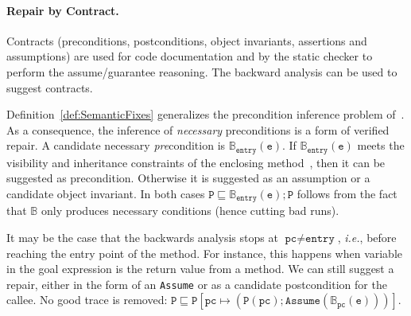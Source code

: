 \documentclass[10pt]{sigplanconf}
\newcommand{\code}[1]{\texttt{#1}}
\begin{document}
\paragraph{Repair by Contract.}
Contracts (preconditions, postconditions, object invariants,
assertions and assumptions) are used for code documentation and by the
static checker to perform the assume/guarantee reasoning.  The
backward analysis can be used to suggest contracts.

Definition~\ref{def:SemanticFixes} generalizes the precondition
inference problem of~\cite{CousotCousotLogozzo-VMCAI11}.  As a
consequence, the inference of \emph{necessary} preconditions is a form
of verified repair.  A candidate necessary \emph{pre}condition is
$\mathbb{B}_{\code{entry}}(\code{e})$.  If
$\mathbb{B}_{\code{entry}}(\code{e})$ meets the visibility and
inheritance constraints of the enclosing method~\cite{LiskovWing94},
then it can be suggested as precondition.  Otherwise it is suggested
as an assumption or a candidate object invariant.  In both cases $\code{P}
\sqsubseteq \mathbb{B}_{\code{entry}}(\code{e}); \code{P}$ follows
from the fact that $\mathbb{B}$ only produces necessary conditions
(hence cutting bad runs).

It may be the case that the backwards analysis stops at $\code{pc}
\neq \code{entry}$, \emph{i.e.}, before reaching the entry point of the
method.  For instance, this happens when variable in the goal
expression is the return value from a method.  We can still suggest a
repair, either in the form of an \code{Assume} or as a candidate
postcondition for the callee.  No good trace is removed: $\code{P}
\sqsubseteq \code{P}[\code{pc} \mapsto (\code{P}(\code{pc});
\code{Assume}(\mathbb{B}_\code{pc}(\code{e})))]$.
\end{document}
